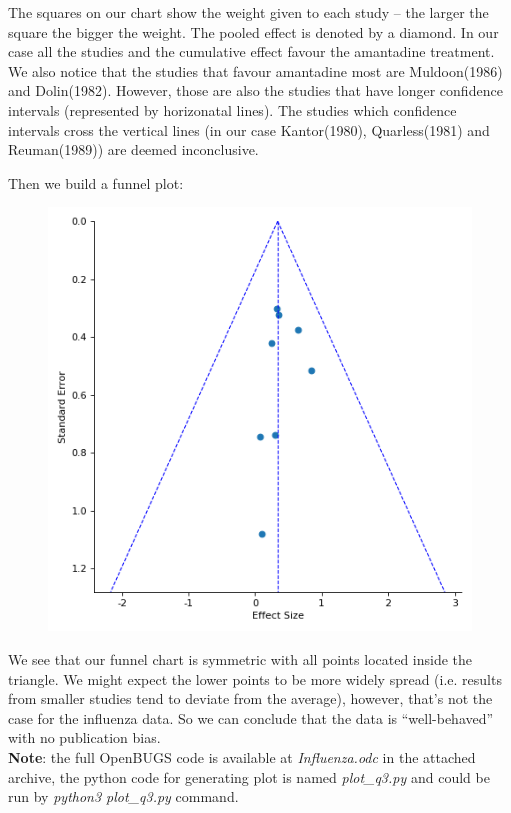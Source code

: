 \documentclass[a4 paper]{article}
\begin{document}
The squares on our chart show the weight 
given to each study -- the larger the square 
the bigger the weight. The pooled effect 
is denoted by a diamond. In our case all 
the studies and the cumulative effect 
favour the amantadine treatment. 
We also notice that the studies that 
favour amantadine most are Muldoon(1986)
and Dolin(1982). However, those are also 
the studies that have longer
confidence intervals (represented by horizonatal lines).
The studies which confidence intervals 
cross the vertical lines
(in our case Kantor(1980), Quarless(1981) 
and Reuman(1989)) are deemed 
inconclusive.


Then we build a funnel plot:

\begin{figure}[H]
	\includegraphics[scale=0.6]{q3_3}
	\centering
	\label{q3_3}
\end{figure}

We see that our funnel chart is symmetric
with all points located inside the triangle.
We might expect the lower points to be 
more widely spread (i.e. results from smaller 
studies tend to deviate from the average), 
however, that's not the case for the 
influenza data.
So we can conclude that the 
data is ``well-behaved'' with no publication bias.  \\

\textbf{Note}: the full OpenBUGS code is available 
at \textit{Influenza.odc} in the attached archive,
the python code for generating plot 
is named \textit{plot\_q3.py} and could be 
run by \textit{python3 plot\_q3.py} command.  \\ 
\end{document}
